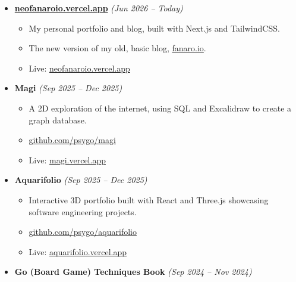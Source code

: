 \documentclass[14pt]{extarticle}
\renewcommand{\_}{\leavevmode\kern.06em\vbox{\hrule width.425em}}
\begin{document}
\begin{itemize}
  \item \textbf{\href{https://neofanaroio.vercel.app}{neofanaroio.vercel.app}
} \textit{(Jun 2026 -- Today)}
    \begin{itemize}
      \item My personal portfolio and blog, built with Next.js and TailwindCSS.
      \item The new version of my old, basic blog, \href{https://github.com/psygo/fanaro.io}{fanaro.io}.
      \item Live: \href{https://neofanaroio.vercel.app}{neofanaroio.vercel.app}
    \end{itemize}
    
  \item \textbf{Magi} \textit{(Sep 2025 -- Dec 2025)} 
    \begin{itemize}
      \item A 2D exploration of the internet, using SQL and Excalidraw to create a graph database.
      \item \href{https://github.com/psygo/magi}{github.com/psygo/magi}
      \item Live: \href{https://magi-phi.vercel.app/}{magi.vercel.app}
    \end{itemize}
    
  \item \textbf{Aquarifolio} \textit{(Sep 2025 -- Dec 2025)}
    \begin{itemize}
      \item Interactive 3D portfolio built with React and Three.js showcasing software engineering projects.
      \item \href{https://github.com/psygo/aquarifolio}{github.com/psygo/aquarifolio}
      \item Live: \href{https://aquarifolio.vercel.app}{aquarifolio.vercel.app}
    \end{itemize}
    
  \item \textbf{Go (Board Game) Techniques Book} \textit{(Sep 2024 -- Nov 2024)}
    

\end{itemize}
\end{document}
